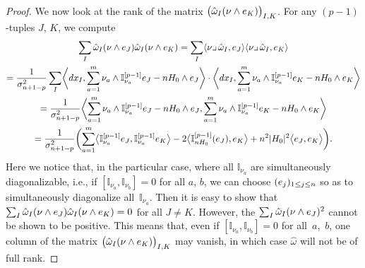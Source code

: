 \documentclass[11pt]{article}
\numberwithin{equation}{section}
\numberwithin{equation}{section}
\begin{document}
\begin{proof}
We now look at the rank of the matrix $\bigl(\hat{\omega}_I(\nu\wedge {\rm e}_K)\bigr)_{I,K}$. For any $(p-1)$-tuples $J$, $K$, we compute
\begin{gather*}
\sum_I\hat{\omega}_I(\nu\wedge {\rm e}_J)\hat{\omega}_I(\nu\wedge {\rm e}_K)=\sum_I\langle\nu\lrcorner\,\hat{\omega}_I,{\rm e}_J\rangle\langle\nu\lrcorner\,\hat{\omega}_I,{\rm e}_K\rangle\\
 =\frac{1}{\sigma_{n+1-p}^2}\sum_I \biggl\langle {\rm d}x_I,\sum_{a=1}^m \nu_a\wedge\mathbb{I}_{\nu_a}^{[p-1]}{\rm e}_J-nH_0\wedge {\rm e}_J\biggr\rangle\cdot \biggl\langle {\rm d}x_I,\sum_{a=1}^m \nu_a\wedge\mathbb{I}_{\nu_a}^{[p-1]}{\rm e}_K-nH_0\wedge {\rm e}_K\biggr\rangle\\
 =\frac{1}{\sigma_{n+1-p}^2}\biggl\langle\sum_{a=1}^m \nu_a\wedge\mathbb{I}_{\nu_a}^{[p-1]}{\rm e}_J-nH_0\wedge {\rm e}_J,
\sum_{a=1}^m \nu_a\wedge\mathbb{I}_{\nu_a}^{[p-1]}{\rm e}_K-nH_0\wedge {\rm e}_K\biggr\rangle\\
 =\frac{1}{\sigma_{n+1-p}^2}\biggl(\sum_{a=1}^m\bigl\langle \mathbb{I}_{\nu_a}^{[p-1]}{\rm e}_J,\mathbb{I}_{\nu_a}^{[p-1]}{\rm e}_K\bigr\rangle
-2\bigl\langle\mathbb{I}_{nH_0}^{[p-1]}({\rm e}_J),{\rm e}_K\bigr\rangle+n^2|H_0|^2\bigl\langle {\rm e}_J,{\rm e}_K\bigr\rangle\biggr).
\end{gather*}
Here we notice that, in the particular case, where all $\mathbb{I}_{\nu_a}$ are simultaneously diagonalizable, i.e., if $[\mathbb{I}_{\nu_a},\mathbb{I}_{\nu_b}]=0$ for all $a$, $b$, we can choose $({\rm e}_j)_{1\leq j\leq n}$ so as to simultaneously diagonalize all~$\mathbb{I}_{\nu_a}$.
Then it is easy to show that $\sum_I\hat{\omega}_I(\nu\wedge {\rm e}_J)\hat{\omega}_I(\nu\wedge {\rm e}_K)=0$ for all $J\neq K$.
However, the $\sum_I\hat{\omega}_I(\nu\wedge {\rm e}_J)^2$ cannot be shown to be positive.
This means that, even if $[\mathbb{I}_{\nu_a},\mathbb{I}_{\nu_b}]=0$ for all~$a$,~$b$, one column of the matrix $\bigl(\hat{\omega}_I(\nu\wedge {\rm e}_K)\bigr)_{I,K}$ may vanish, in which case $\hat{\omega}$ will not be of full rank.


\end{proof}
\end{document}
